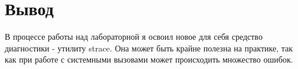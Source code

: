 \section{Вывод}

В процессе работы над лабораторной я освоил новое для себя средство диагностики - утилиту strace. Она может быть крайне полезна на практике, так как при работе с системными вызовами может происходить множество ошибок.

